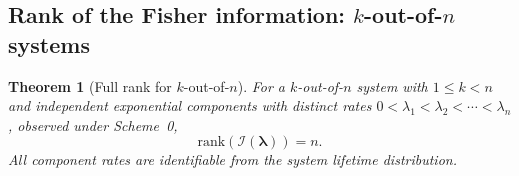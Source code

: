 \documentclass[12pt]{article}
\newtheorem{theorem}{Theorem}
\theoremstyle{definition}
\theoremstyle{remark}
\newcommand{\rank}{\mathrm{rank}}
\newcommand{\blam}{\boldsymbol{\lambda}}
\begin{document}
\subsection{Rank of the Fisher information: $k$-out-of-$n$ systems}
\label{sec:kofn-rank}

\begin{theorem}[Full rank for $k$-out-of-$n$]
\label{thm:kofn-rank}
For a $k$-out-of-$n$ system with $1 \leq k < n$ and independent
exponential components with distinct rates
$0 < \lambda_1 < \lambda_2 < \cdots < \lambda_n$, observed under
Scheme~0,
\begin{equation}\label{eq:kofn-rank}
  \rank(\mathcal{I}(\blam)) = n.
\end{equation}
All component rates are identifiable from the system lifetime
distribution.
\end{theorem}
\end{document}
